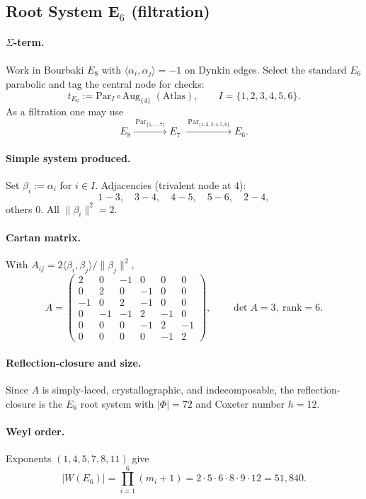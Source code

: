 \documentclass[12pt]{article}
\begin{document}
\subsection{Root System E$_6$ (filtration)}\label{sec:e6-filtration}

\paragraph{$\Sigma$-term.}
Work in Bourbaki $E_8$ with $\langle\alpha_i,\alpha_j\rangle=-1$ on Dynkin edges. Select the standard $E_6$ parabolic and tag the central node for checks:
\[
t_{E_6}:=\mathrm{Par}_{I}\circ \mathrm{Aug}_{\{4\}}\;(\text{Atlas}),\qquad
I=\{1,2,3,4,5,6\}.
\]
As a filtration one may use
\[
E_8 \xrightarrow{\ \mathrm{Par}_{\{1,\dots,7\}}\ } E_7
\;\xrightarrow{\ \mathrm{Par}_{\{1,2,3,4,5,6\}}\ } E_6 .
\]

\paragraph{Simple system produced.}
Set $\beta_i:=\alpha_i$ for $i\in I$. Adjacencies (trivalent node at $4$):
\[
1\!-\!3,\quad 3\!-\!4,\quad 4\!-\!5,\quad 5\!-\!6,\quad 2\!-\!4,
\]
others $0$. All $\|\beta_i\|^2=2$.

\paragraph{Cartan matrix.}
With $A_{ij}=2\langle\beta_i,\beta_j\rangle/\|\beta_j\|^2$,
\[
A=
\begin{pmatrix}
2&0&-1&0&0&0\\
0&2&0&-1&0&0\\
-1&0&2&-1&0&0\\
0&-1&-1&2&-1&0\\
0&0&0&-1&2&-1\\
0&0&0&0&-1&2
\end{pmatrix},
\qquad \det A=3,\ \mathrm{rank}=6.
\]

\paragraph{Reflection-closure and size.}
Since $A$ is simply-laced, crystallographic, and indecomposable, the reflection-closure is the $E_6$ root system with $|\Phi|=72$ and Coxeter number $h=12$.

\paragraph{Weyl order.}
Exponents $(1,4,5,7,8,11)$ give
\[
|W(E_6)|=\prod_{i=1}^6 (m_i+1)=2\cdot5\cdot6\cdot8\cdot9\cdot12=51{,}840.
\]
\end{document}
